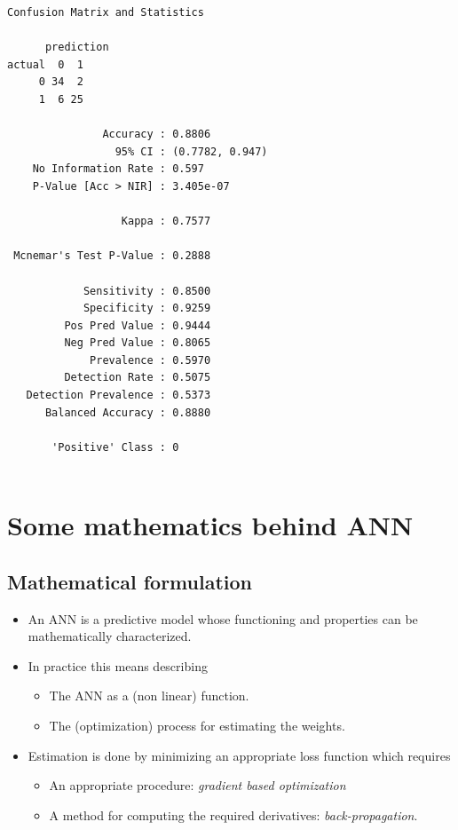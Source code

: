 \documentclass[
  letterpaper,
  DIV=11,
  numbers=noendperiod,
  oneside]{scrartcl}
\providecommand{\tightlist}{%
  \setlength{\itemsep}{0pt}\setlength{\parskip}{0pt}}\usepackage{longtable,booktabs,array}
\begin{document}
\begin{verbatim}
Confusion Matrix and Statistics

      prediction
actual  0  1
     0 34  2
     1  6 25
                                         
               Accuracy : 0.8806         
                 95% CI : (0.7782, 0.947)
    No Information Rate : 0.597          
    P-Value [Acc > NIR] : 3.405e-07      
                                         
                  Kappa : 0.7577         
                                         
 Mcnemar's Test P-Value : 0.2888         
                                         
            Sensitivity : 0.8500         
            Specificity : 0.9259         
         Pos Pred Value : 0.9444         
         Neg Pred Value : 0.8065         
             Prevalence : 0.5970         
         Detection Rate : 0.5075         
   Detection Prevalence : 0.5373         
      Balanced Accuracy : 0.8880         
                                         
       'Positive' Class : 0              
                                         
\end{verbatim}

\hypertarget{some-mathematics-behind-ann}{%
\section{Some mathematics behind
ANN}\label{some-mathematics-behind-ann}}

\hypertarget{mathematical-formulation}{%
\subsection{Mathematical formulation}\label{mathematical-formulation}}

\begin{itemize}
\item
  An ANN is a predictive model whose functioning and properties can be
  mathematically characterized.
\item
  In practice this means describing

  \begin{itemize}
  \tightlist
  \item
    The ANN as a (non linear) function.
  \item
    The (optimization) process for estimating the weights.
  \end{itemize}
\item
  Estimation is done by minimizing an appropriate loss function which
  requires

  \begin{itemize}
  \tightlist
  \item
    An appropriate procedure: \emph{gradient based optimization}
  \item
    A method for computing the required derivatives:
    \emph{back-propagation}.
  \end{itemize}
\end{itemize}
\end{document}

